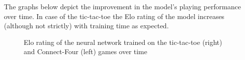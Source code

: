 \documentclass[english]{article}
\begin{document}
The graphs below depict the improvement in the model's playing performance over time. In case of the tic-tac-toe the Elo rating of the model increases (although not strictly) with training time as expected.

\begin{figure}[h]
\centering
{}
\caption{Elo rating of the neural network trained on the tic-tac-toe (right) and Connect-Four (left) games over time}
\end{figure}

\end{document}
